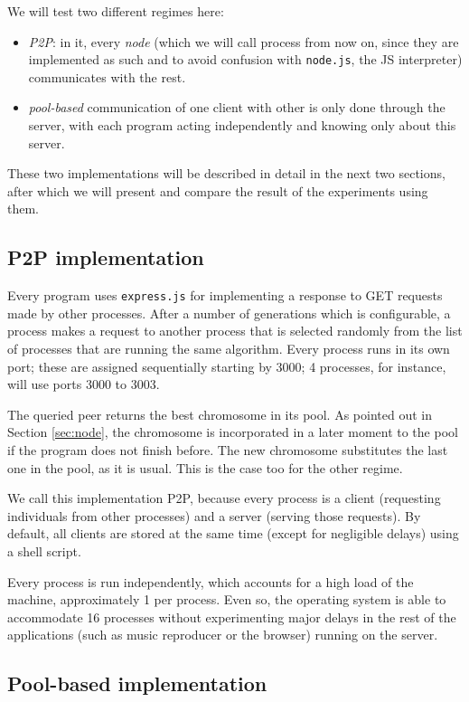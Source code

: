 \documentclass{sig-alternate}
\begin{document}
We will test two different regimes here:\begin{itemize}
\item {\em P2P}: in it, every {\em node} (which we will call
  process from now on, since they are implemented as such and to avoid
  confusion with {\tt node.js}, the JS interpreter) communicates with the
  rest.
\item {\em pool-based} communication of one client with other is only
  done through the server, with each program acting independently and
  knowing only about this server. 
\end{itemize}

These two implementations will be described in detail in the next two
sections, after which we will present and compare the result of the experiments
using them.

\subsection{P2P implementation}

Every program uses {\tt express.js} for implementing a response to GET
requests made by other processes. After a number of generations which
is configurable, a process makes a request to another process that is
selected randomly from the list of processes that are running the same
algorithm. Every process runs in its own port; these are assigned
sequentially starting by 3000; 4 processes, for instance, will use
ports 3000 to 3003. 

The queried peer returns the best chromosome in its pool. As pointed out 
in Section \ref{sec:node}, the chromosome is incorporated in a
later moment to the pool if the program does not finish before. The
new chromosome substitutes the last one in the pool, as it is usual. This
is the case too for the other regime. 

We call this implementation P2P, because every process is a client
(requesting individuals from other processes) and a server (serving
those requests). By default, all clients are stored at the same time
(except for negligible delays) using a shell script. 

Every process is run independently, which accounts for a high load of
the machine, approximately 1 per process. Even so, the operating
system is able to accommodate 16 processes without experimenting major
delays in the rest of the applications (such as music reproducer or
the browser) running on the server. 

\subsection{Pool-based implementation}
\end{document}
